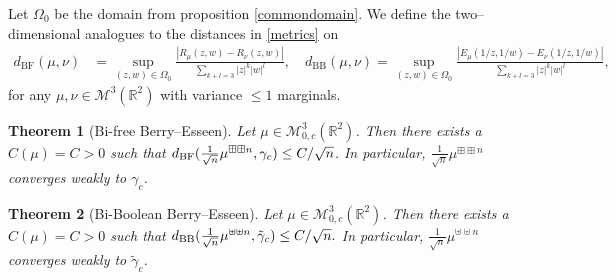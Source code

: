 \documentclass{amsart}
\newtheorem{theorem}{Theorem}[section]
\theoremstyle{definition}
\theoremstyle{remark}
\numberwithin{equation}{section}
\begin{document}
Let $\Omega_0$ be the domain from proposition \ref{commondomain}. We define the two--dimensional analogues to the distances in \eqref{metrics} on 
\begin{align*}
    d_{\text{BF}}(\mu, \nu) &= \sup_{(z,w)\in \Omega_0}\frac{|R_\mu(z,w)-R_\nu(z,w)|}{\sum_{k+l=3}|z|^k|w|^l},\quad d_{\text{BB}}(\mu, \nu) = \sup_{(z,w)\in \Omega_0}\frac{|E_\mu({1}/{z},1/w)-E_\nu(1/z,1/w)|}{\sum_{k+l=3}|z|^k|w|^l},
\end{align*}
for any $\mu,\nu \in \mathcal{M}^{3}(\mathbb{R}^2)$ with variance $\leq 1$ marginals.

\begin{theorem}[Bi-free Berry--Esseen]\label{BifBE} Let $\mu\in \mathcal{M}_{0,c}^3(\mathbb{R}^2)$. Then there exists a $C(\mu)=C>0$ such that $d_{\text{\normalfont{BF}}}(\tfrac{1}{\sqrt{n}}\mu^{{\boxplus\boxplus}n},\gamma_c)\leq {C}/{\sqrt{n}}$.
In particular, $\tfrac{1}{\sqrt{n}}\mu^{{\boxplus\boxplus}n}$ converges weakly to $\gamma_c$.
\end{theorem}
\begin{theorem}[Bi-Boolean Berry--Esseen]\label{BboolBE} Let $\mu\in \mathcal{M}_{0,c}^3(\mathbb{R}^2)$. Then there exists a $C(\mu)=C>0$ such that $d_{\text{\normalfont{BB}}}(\tfrac{1}{\sqrt{n}}\mu^{{\uplus\uplus}n},\tilde{\gamma}_c)\leq {C}/{\sqrt{n}}.$
In particular, $\tfrac{1}{\sqrt{n}}\mu^{{\uplus\uplus}n}$ converges weakly to $\tilde{\gamma}_c$.
\end{theorem}
\end{document}
